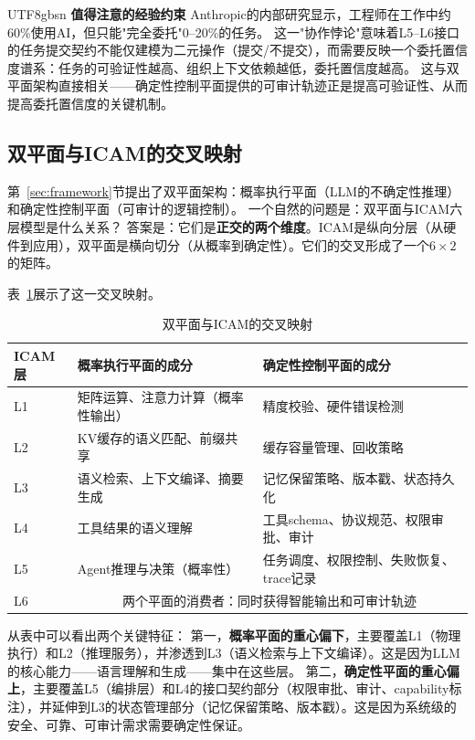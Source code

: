 \documentclass[11pt,a4paper]{article}
\begin{document}
\begin{CJK*}{UTF8}{gbsn}
\textbf{值得注意的经验约束}
Anthropic的内部研究显示，工程师在工作中约60\%使用AI，但只能"完全委托"0--20\%的任务\cite{anthropic2026agenticreport}。
这一"协作悖论"意味着L5--L6接口的任务提交契约不能仅建模为二元操作（提交/不提交），而需要反映一个委托置信度谱系：任务的可验证性越高、组织上下文依赖越低，委托置信度越高。
这与双平面架构直接相关——确定性控制平面提供的可审计轨迹正是提高可验证性、从而提高委托置信度的关键机制。

\subsection{双平面与ICAM的交叉映射}
\label{sec:dual-plane-icam}

第~\ref{sec:framework}节提出了双平面架构：概率执行平面（LLM的不确定性推理）和确定性控制平面（可审计的逻辑控制）。
一个自然的问题是：双平面与ICAM六层模型是什么关系？
答案是：它们是\textbf{正交的两个维度}。ICAM是纵向分层（从硬件到应用），双平面是横向切分（从概率到确定性）。它们的交叉形成了一个$6 \times 2$的矩阵。

表~\ref{tab:dual-plane-icam}展示了这一交叉映射。

\begin{table}[t]
\centering
\footnotesize
\caption{双平面与ICAM的交叉映射}
\label{tab:dual-plane-icam}
\begin{tabularx}{\textwidth}{p{}p{}p{}}
\toprule
ICAM层 & 概率执行平面的成分 & 确定性控制平面的成分 \\
\midrule
L1 & 矩阵运算、注意力计算（概率性输出） & 精度校验、硬件错误检测 \\
L2 & KV缓存的语义匹配、前缀共享 & 缓存容量管理、回收策略 \\
L3 & 语义检索、上下文编译、摘要生成 & 记忆保留策略、版本戳、状态持久化 \\
L4 & 工具结果的语义理解 & 工具schema、协议规范、权限审批、审计 \\
L5 & Agent推理与决策（概率性） & 任务调度、权限控制、失败恢复、trace记录 \\
L6 & \multicolumn{2}{c}{两个平面的消费者：同时获得智能输出和可审计轨迹} \\
\bottomrule
\end{tabularx}
\end{table}

从表中可以看出两个关键特征：
第一，\textbf{概率平面的重心偏下}，主要覆盖L1（物理执行）和L2（推理服务），并渗透到L3（语义检索与上下文编译）。这是因为LLM的核心能力——语言理解和生成——集中在这些层。
第二，\textbf{确定性平面的重心偏上}，主要覆盖L5（编排层）和L4的接口契约部分（权限审批、审计、capability标注），并延伸到L3的状态管理部分（记忆保留策略、版本戳）。这是因为系统级的安全、可靠、可审计需求需要确定性保证。


\end{CJK*}
\end{document}
